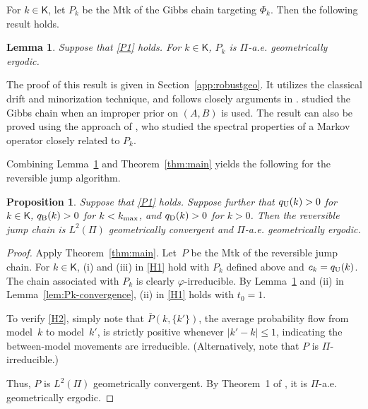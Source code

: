\documentclass[12pt]{article}
\newcommand{\df}{\mathrm{d}}
\newcommand{\Z}{\mathsf{Z}}
\newtheorem{lemma}[theorem]{Lemma}
\newtheorem{proposition}[theorem]{Proposition}
\begin{document}
	
	
	For $k \in \mathsf{K}$, let $P_k$ be the Mtk of the Gibbs chain targeting $\Phi_k$.
	Then the following result holds.
	
	
	
	\begin{lemma} \label{lem:robustgeo}
		Suppose that \ref{P1} holds.
		For $k \in \mathsf{K}$, $P_k$ is $\Pi$-a.e. geometrically ergodic.
	\end{lemma}
	
	The proof of this result is given in Section~\ref{app:robustgeo}.
	It utilizes the classical drift and minorization technique, and follows closely arguments in \cite{roy2010monte}.
	\cite{roy2010monte} studied the Gibbs chain when an improper prior on $(A,B)$ is used.
	The result can also be proved using the approach of \cite{choi2013analysis}, who studied the spectral properties of a Markov operator closely related to $P_k$.
	
	Combining Lemma~\ref{lem:robustgeo} and Theorem~\ref{thm:main} yields the following for the reversible jump algorithm.
	
	\begin{proposition} \label{pro:ar}
		Suppose that \ref{P1} holds.
		Suppose further that $q_{\scriptsize\mbox{U}}(k) > 0$ for $k \in \mathsf{K}$, $q_{\scriptsize\mbox{B}}(k) > 0$ for $k < k_{\scriptsize \mbox{max}}$, and $q_{\scriptsize\mbox{D}}(k) > 0$ for $k > 0$.
		Then the reversible jump chain is $L^2(\Pi)$ geometrically convergent and $\Pi$-a.e. geometrically ergodic.
	\end{proposition}
	\begin{proof}
		Apply Theorem~\ref{thm:main}.
		Let~$P$ be the Mtk of the reversible jump chain.
		For $k \in \mathsf{K}$, (i) and (iii) in \ref{H1} hold with $P_k$ defined above and $c_k = q_{\scriptsize\mbox{U}}(k)$.
		The chain associated with $P_k$ is clearly $\varphi$-irreducible.
		By Lemma~\ref{lem:robustgeo} and (ii) in Lemma~\ref{lem:Pk-convergence}, (ii) in \ref{H1} holds with $t_0 = 1$.
		
		To verify \ref{H2}, simply note that $\bar{P}(k,\{k'\})$, the average probability flow from model~$k$ to model~$k'$, is strictly positive whenever $|k'-k| \leq 1$, indicating the between-model movements are irreducible.
		(Alternatively, note that $P$ is $\Pi$-irreducible.)
		
		
		
		Thus, $P$ is $L^2(\Pi)$ geometrically convergent.
		By Theorem~1 of \cite{roberts2001geometric}, it is $\Pi$-a.e. geometrically ergodic.
	\end{proof}
	
\end{document}
